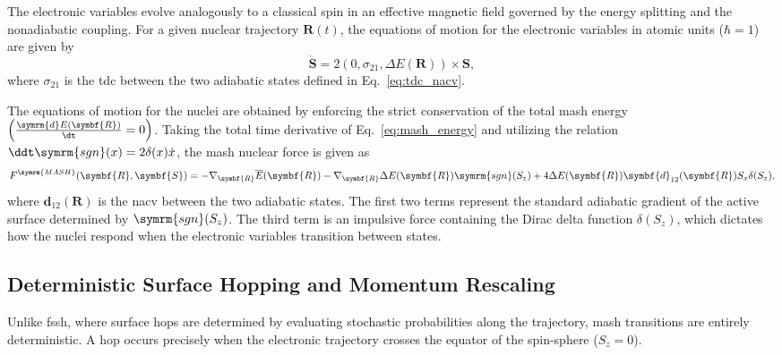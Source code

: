The electronic variables evolve analogously to a classical spin in an effective magnetic field governed by the energy splitting and the nonadiabatic coupling. For a given nuclear trajectory $\symbf{R}(t)$, the equations of motion for the electronic variables in atomic units ($\hbar=1$) are given by
\begin{equation}
\dot{\symbf{S}}=2\left(0,\sigma_{21},\Delta E(\symbf{R})\right)\times\symbf{S},
\end{equation}
where $\sigma_{21}$ is the \acrfull{tdc} between the two adiabatic states defined in Eq.~\eqref{eq:tdc_nacv}.

The equations of motion for the nuclei are obtained by enforcing the strict conservation of the total \acrshort{mash} energy $\left(\frac{\symrm{d}E(\symbf{R})}{\dt}=0\right)$. Taking the total time derivative of Eq.~\eqref{eq:mash_energy} and utilizing the relation $\ddt\symrm{sgn}(x) = 2\delta(x)\dot{x}$, the \acrshort{mash} nuclear force is given as
\begin{equation}\label{eq:mash_force}
F^{\symrm{MASH}}(\symbf{R},\symbf{S})=-\nabla_{\symbf{R}}\overline{E}(\symbf{R})-\nabla_{\symbf{R}}\Delta E(\symbf{R})\symrm{sgn}(S_z)+4\Delta E(\symbf{R})\symbf{d}_{12}(\symbf{R})S_x\delta(S_z),
\end{equation}
where $\symbf{d}_{12}(\symbf{R})$ is the \acrfull{nacv} between the two adiabatic states. The first two terms represent the standard adiabatic gradient of the active surface determined by $\symrm{sgn}(S_z)$. The third term is an impulsive force containing the Dirac delta function $\delta(S_z)$, which dictates how the nuclei respond when the electronic variables transition between states.
\subsection{Deterministic Surface Hopping and Momentum Rescaling}\label{sec:mash_hopping}
Unlike \acrshort{fssh}, where surface hops are determined by evaluating stochastic probabilities along the trajectory, \acrshort{mash} transitions are entirely deterministic. A hop occurs precisely when the electronic trajectory crosses the equator of the spin-sphere ($S_z=0$). 

